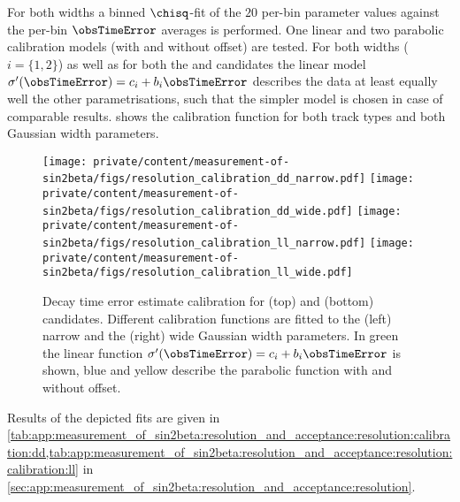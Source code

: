 For both widths a binned $\chisq$-fit of the $\num{20}$ per-bin parameter values
against the per-bin $\obsTimeError$ averages is performed. One linear and two
parabolic calibration models (with and without offset) are tested. For both
widths ($i = \{1,2\}$) as well as for both the \catDD and \catLL candidates the linear model
$\sigma^\prime(\obsTimeError) = c_i + b_i \obsTimeError$ describes the data at
least equally well \wrt the other parametrisations, such that the simpler model
is chosen in case of comparable results.
shows the calibration function for both track types and both Gaussian width
parameters.
%
\begin{figure}[h]
\texttt{[image: private/content/measurement-of-sin2beta/figs/resolution\_calibration\_dd\_narrow.pdf]}
\texttt{[image: private/content/measurement-of-sin2beta/figs/resolution\_calibration\_dd\_wide.pdf]}
\texttt{[image: private/content/measurement-of-sin2beta/figs/resolution\_calibration\_ll\_narrow.pdf]}
\texttt{[image: private/content/measurement-of-sin2beta/figs/resolution\_calibration\_ll\_wide.pdf]}
\caption{Decay time error estimate calibration for (top) \catDD and (bottom)
\catLL candidates. Different calibration functions are fitted to the (left)
narrow and the (right) wide Gaussian width parameters. In green the linear
function $\sigma^\prime(\obsTimeError) = c_i + b_i \obsTimeError$ is shown, blue
and yellow describe the parabolic function with and without offset.}
\label{fig:measurement_of_sin2beta:resolution_and_acceptance:resolution:calibration}
\end{figure}
%
Results of the depicted fits are given in 
\cref{tab:app:measurement_of_sin2beta:resolution_and_acceptance:resolution:calibration:dd,tab:app:measurement_of_sin2beta:resolution_and_acceptance:resolution:calibration:ll}
in \cref{sec:app:measurement_of_sin2beta:resolution_and_acceptance:resolution}.

